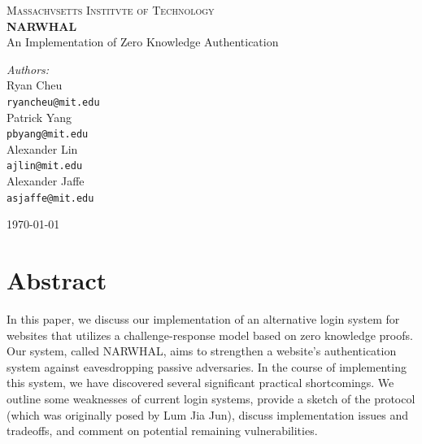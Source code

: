\documentclass[11pt]{article}
\begin{document}
\begin{titlepage}

\begin{center}

\textsc{\LARGE Massachvsetts Institvte of Technology}\\[0.5cm]


{ \huge \bfseries NARWHAL \\[0.4cm] }
{\Large An Implementation of Zero Knowledge Authentication}\\[0.5cm]


\begin{minipage}{0.4\textwidth}
\begin{flushleft} \large
\emph{Authors:}\\[0.5cm]
Ryan Cheu \\
{\tt ryancheu@mit.edu} \\[1cm]
Patrick Yang \\
{\tt pbyang@mit.edu} \\[1cm]
Alexander Lin \\
{\tt ajlin@mit.edu} \\[1cm]
Alexander Jaffe \\
{\tt asjaffe@mit.edu}
\end{flushleft}
\end{minipage}
\begin{minipage}{0.4\textwidth}
\begin{flushright} \large

\end{flushright}
\end{minipage}

\vfill

{\large \today}

\end{center}

\end{titlepage}

\section{Abstract}

In this paper, we discuss our implementation of an alternative login system for websites that utilizes a challenge-response model based on zero knowledge proofs.  Our system, called NARWHAL, aims to strengthen a website's authentication system against eavesdropping passive adversaries.  In the course of implementing this system, we have discovered several significant practical shortcomings.  We outline some weaknesses of current login systems, provide a sketch of the protocol (which was originally posed by Lum Jia Jun), discuss implementation issues and tradeoffs, and comment on potential remaining vulnerabilities.
\end{document}
